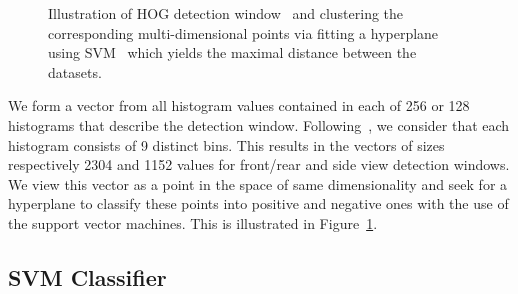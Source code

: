 \begin{figure}[t]%
\centering
{}
\caption{Illustration of HOG detection window~ and clustering the corresponding multi-dimensional points via fitting a hyperplane using SVM~ which yields the maximal distance between the datasets.}
\label{fig:det_to_svm}
\end{figure}

We form a vector from all histogram values contained in each of 256 or 128
histograms that describe the detection window. Following~\citet{dalal2005}, we
consider that each histogram consists of 9 distinct bins. This results in the
vectors of sizes respectively 2304 and 1152 values for front/rear and side
view detection windows. We view this vector as a point in the space of same
dimensionality and seek for a hyperplane to classify these points into
positive and negative ones with the use of the support vector machines. This
is illustrated in Figure~\ref{fig:det_to_svm}.


\subsection{SVM Classifier}\label{sub:svm_classifier}

